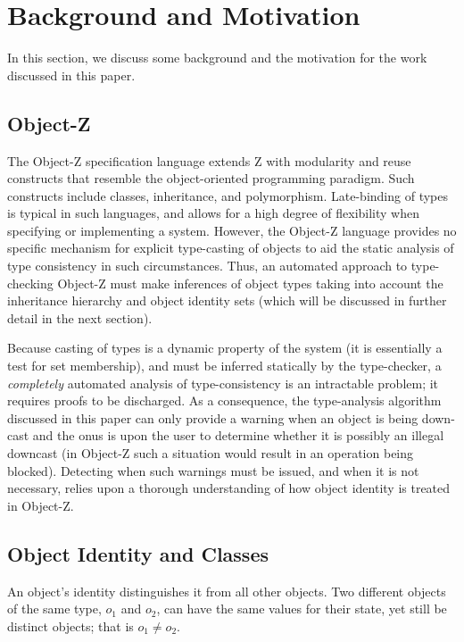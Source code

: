 \section{Background and Motivation}
\label{background}

In this section, we discuss some background and the motivation for the
work discussed in this paper.

\subsection{Object-Z}

The Object-Z specification language extends Z with modularity and reuse
constructs that resemble the object-oriented programming paradigm. Such
constructs include classes, inheritance, and polymorphism. Late-binding
of types is typical in such languages, and allows for a high degree of
flexibility when specifying or implementing a system. However, the
Object-Z language provides no specific mechanism for explicit
type-casting of objects to aid the static analysis of type consistency
in such circumstances. Thus, an automated approach to type-checking
Object-Z must make inferences of object types taking into account the
inheritance hierarchy and object identity sets (which will be discussed
in further detail in the next section). 

Because casting of types is a dynamic property of the system (it is
essentially a test for set membership), and must be inferred
statically by the type-checker, a {\em completely} automated analysis
of type-consistency is an intractable problem; it requires proofs to
be discharged. As a consequence, the type-analysis algorithm discussed
in this paper can only provide a warning when an object is being
down-cast and the onus is upon the user to determine whether it is
possibly an illegal downcast (in Object-Z such a situation would
result in an operation being blocked). Detecting when such warnings
must be issued, and when it is not necessary, relies upon a thorough
understanding of how object identity is treated in Object-Z.

\subsection{Object Identity and Classes}

An object's identity distinguishes it from all other objects.  Two
different objects of the same type, $o_{1}$ and $o_{2}$, can have the
same values for their state, yet still be distinct objects; that is
$o_{1} \neq o_{2}$.

